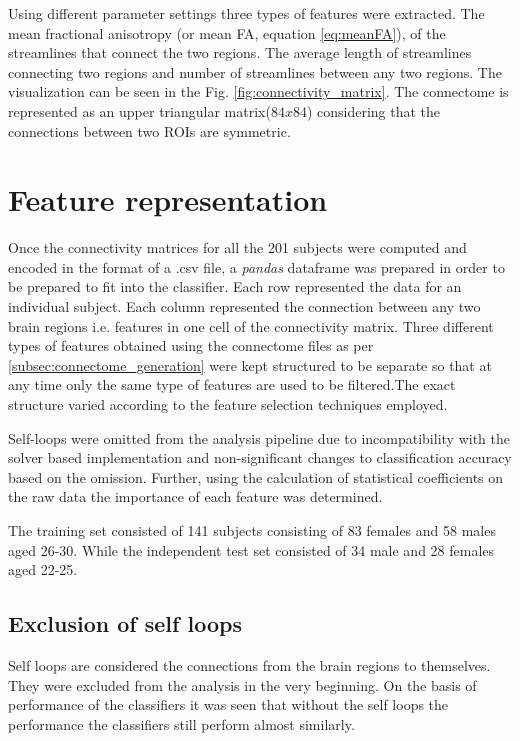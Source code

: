 \documentclass[msthesis.tex]{subfiles}
\begin{document}
Using different parameter settings three types of features were extracted. The mean fractional anisotropy (or mean FA, equation \ref{eq:meanFA}), of the streamlines that connect the two regions. The average length of streamlines connecting two regions and number of streamlines between any two regions. The visualization can be seen in the Fig. \ref{fig:connectivity_matrix}. The connectome is represented as an upper triangular matrix($84 x 84$) considering that the connections between two ROIs are symmetric.

\section{Feature representation}
Once the connectivity matrices for all the 201 subjects were computed and encoded in the format of a .csv file, a \textit{pandas} dataframe was prepared in order to be prepared to fit into the classifier. Each row represented the data for an individual subject. Each column represented the connection between any two brain regions i.e. features in one cell of the connectivity matrix. Three different types of features obtained using the connectome files as per \ref{subsec:connectome_generation} were kept structured to be separate so that at any time only the same type of features are used to be filtered.The exact structure varied according to the feature selection techniques employed.

Self-loops were omitted from the analysis pipeline due to incompatibility with the solver based implementation and non-significant changes to classification accuracy based on the omission. Further, using the calculation of statistical coefficients on the raw data the importance of each feature was determined.

The training set consisted of 141 subjects consisting of 83 females and 58 males aged 26-30. While the independent test set consisted of 34 male and 28 females aged 22-25. 

\subsection{Exclusion of self loops}
\label{sec:exclusion}
Self loops are considered the connections from the brain regions to themselves. They were excluded from the analysis in the very beginning. On the basis of performance of the classifiers it was seen that without the self loops the performance the classifiers still perform almost similarly.
\end{document}
